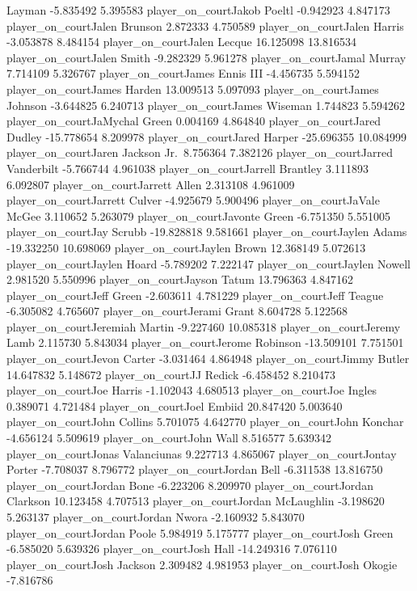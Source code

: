 \documentclass[
  landscape]{article}
\begin{document}
Layman -5.835492 5.395583 player\_on\_courtJakob Poeltl -0.942923
4.847173 player\_on\_courtJalen Brunson 2.872333 4.750589
player\_on\_courtJalen Harris -3.053878 8.484154 player\_on\_courtJalen
Lecque 16.125098 13.816534 player\_on\_courtJalen Smith -9.282329
5.961278 player\_on\_courtJamal Murray 7.714109 5.326767
player\_on\_courtJames Ennis III -4.456735 5.594152
player\_on\_courtJames Harden 13.009513 5.097093 player\_on\_courtJames
Johnson -3.644825 6.240713 player\_on\_courtJames Wiseman 1.744823
5.594262 player\_on\_courtJaMychal Green 0.004169 4.864840
player\_on\_courtJared Dudley -15.778654 8.209978 player\_on\_courtJared
Harper -25.696355 10.084999 player\_on\_courtJaren Jackson Jr.~8.756364
7.382126 player\_on\_courtJarred Vanderbilt -5.766744 4.961038
player\_on\_courtJarrell Brantley 3.111893 6.092807
player\_on\_courtJarrett Allen 2.313108 4.961009
player\_on\_courtJarrett Culver -4.925679 5.900496
player\_on\_courtJaVale McGee 3.110652 5.263079 player\_on\_courtJavonte
Green -6.751350 5.551005 player\_on\_courtJay Scrubb -19.828818 9.581661
player\_on\_courtJaylen Adams -19.332250 10.698069
player\_on\_courtJaylen Brown 12.368149 5.072613 player\_on\_courtJaylen
Hoard -5.789202 7.222147 player\_on\_courtJaylen Nowell 2.981520
5.550996 player\_on\_courtJayson Tatum 13.796363 4.847162
player\_on\_courtJeff Green -2.603611 4.781229 player\_on\_courtJeff
Teague -6.305082 4.765607 player\_on\_courtJerami Grant 8.604728
5.122568 player\_on\_courtJeremiah Martin -9.227460 10.085318
player\_on\_courtJeremy Lamb 2.115730 5.843034 player\_on\_courtJerome
Robinson -13.509101 7.751501 player\_on\_courtJevon Carter -3.031464
4.864948 player\_on\_courtJimmy Butler 14.647832 5.148672
player\_on\_courtJJ Redick -6.458452 8.210473 player\_on\_courtJoe
Harris -1.102043 4.680513 player\_on\_courtJoe Ingles 0.389071 4.721484
player\_on\_courtJoel Embiid 20.847420 5.003640 player\_on\_courtJohn
Collins 5.701075 4.642770 player\_on\_courtJohn Konchar -4.656124
5.509619 player\_on\_courtJohn Wall 8.516577 5.639342
player\_on\_courtJonas Valanciunas 9.227713 4.865067
player\_on\_courtJontay Porter -7.708037 8.796772
player\_on\_courtJordan Bell -6.311538 13.816750 player\_on\_courtJordan
Bone -6.223206 8.209970 player\_on\_courtJordan Clarkson 10.123458
4.707513 player\_on\_courtJordan McLaughlin -3.198620 5.263137
player\_on\_courtJordan Nwora -2.160932 5.843070 player\_on\_courtJordan
Poole 5.984919 5.175777 player\_on\_courtJosh Green -6.585020 5.639326
player\_on\_courtJosh Hall -14.249316 7.076110 player\_on\_courtJosh
Jackson 2.309482 4.981953 player\_on\_courtJosh Okogie -7.816786
\end{document}
